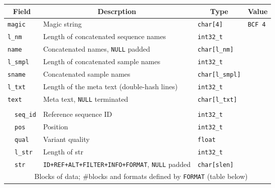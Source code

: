 \documentclass[10pt,pdftex]{article}
\begin{document}
\begin{center}
\begin{tabular}{|l|l|l|l|l|}
\hline
\multicolumn{2}{|c|}{\bf Field} & \multicolumn{1}{c|}{\bf Descrption} & \multicolumn{1}{c|}{\bf Type} & \multicolumn{1}{c|}{\bf Value} \\\hline\hline
\multicolumn{2}{|l|}{\tt magic} & Magic string & {\tt char[4]} & {\tt BCF\char92 4} \\\hline
\multicolumn{2}{|l|}{\tt l\_nm} & Length of concatenated sequence names & {\tt int32\_t} & \\\hline
\multicolumn{2}{|l|}{\tt name} & Concatenated names, {\tt NULL} padded & {\tt char[l\_nm]} & \\\hline
\multicolumn{2}{|l|}{\tt l\_smpl} & Length of concatenated sample names & {\tt int32\_t} & \\\hline
\multicolumn{2}{|l|}{\tt sname} & Concatenated sample names & {\tt char[l\_smpl]} & \\\hline
\multicolumn{2}{|l|}{\tt l\_txt} & Length of the meta text (double-hash lines)& {\tt int32\_t} & \\\hline
\multicolumn{2}{|l|}{\tt text} & Meta text, {\tt NULL} terminated & {\tt char[l\_txt]} & \\\hline
\multicolumn{5}{|c|}{\it \color{gray}{List of records until the end of the file}}\\\cline{2-5}
& {\tt seq\_id} & Reference sequence ID & {\tt int32\_t} & \\\cline{2-5}
& {\tt pos} & Position & {\tt int32\_t} & \\\cline{2-5}
& {\tt qual} & Variant quality & {\tt float} & \\\cline{2-5}
& {\tt l\_str} & Length of str & {\tt int32\_t} & \\\cline{2-5}
& {\tt str} & {\tt ID+REF+ALT+FILTER+INFO+FORMAT}, {\tt NULL} padded & {\tt char[slen]} &\\\cline{2-5}
& \multicolumn{4}{c|}{Blocks of data; \#blocks and formats defined by {\tt FORMAT} (table below)}\\
\hline
\end{tabular}
\end{center}
\end{document}
